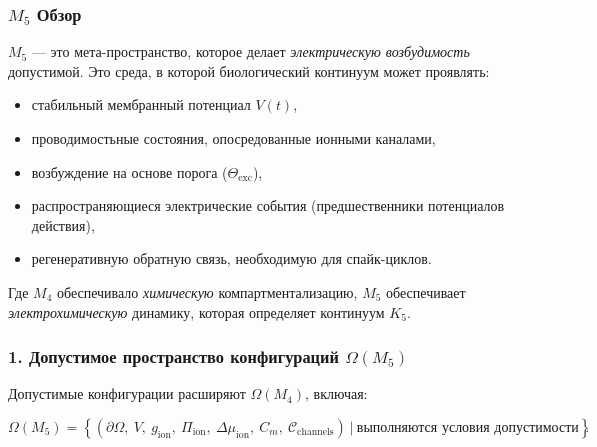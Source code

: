 

\subsubsection{\texorpdfstring{$M_5$}{M_5} Обзор}
\label{sec:m5-overview}

$M_5$ — это мета-пространство, которое делает \emph{электрическую возбудимость} допустимой.
Это среда, в которой биологический континуум может проявлять:

\begin{itemize}
    \item стабильный мембранный потенциал $V(t)$,
    \item проводимостьные состояния, опосредованные ионными каналами,
    \item возбуждение на основе порога ($\Theta_{\mathrm{exc}}$),
    \item распространяющиеся электрические события (предшественники потенциалов действия),
    \item регенеративную обратную связь, необходимую для спайк-циклов.
\end{itemize}

Где $M_4$ обеспечивало \emph{химическую} компартментализацию,
$M_5$ обеспечивает \emph{электрохимическую} динамику, которая определяет континуум $K_5$.

\subsubsection*{1. Допустимое пространство конфигураций \texorpdfstring{$\Omega(M_5)$}{\Omega(M_5)}}

Допустимые конфигурации расширяют $\Omega(M_4)$, включая:

\[
\Omega(M_5) =
\left\{
(\partial\Omega,\ V,\ g_{\mathrm{ion}},\
\Pi_{\mathrm{ion}},\
\Delta\mu_{\mathrm{ion}},\
C_m,\
\mathcal{C}_{\mathrm{channels}})
\ \Big|\
\text{выполняются условия допустимости}
\right\}.
\]

